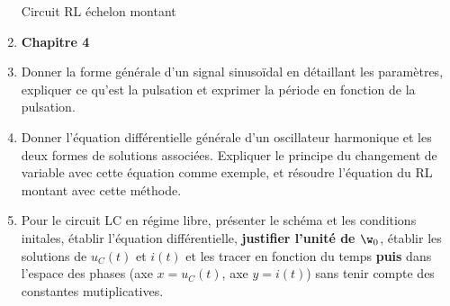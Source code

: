 \documentclass[a4paper, 12pt, final, garamond]{book}
\begin{document}
\begin{enumerate}
\begin{tasks}[label=\protect\fbox{\Alph*}, label-width=4ex]
		      \task Circuit RL échelon montant
	      \end{tasks}
	\item[] \textbf{Chapitre 4}
	\item Donner la forme générale d'un signal sinusoïdal en détaillant les
	      paramètres, expliquer ce qu'est la pulsation et exprimer la période en
	      fonction de la pulsation.
	\item Donner l'équation différentielle générale d'un oscillateur harmonique
	      et les deux formes de solutions associées. Expliquer le principe du
	      changement de variable avec cette équation comme exemple, et résoudre
	      l'équation du RL montant avec cette méthode.
	\item Pour le circuit LC en régime libre, présenter le schéma et les
        conditions initales, établir l'équation différentielle,
        \textbf{justifier l'unité de $\w_0$}, établir les solutions de $u_C(t)$
        et $i(t)$ et les tracer en fonction du temps \textbf{puis} dans l'espace
        des phases (axe $x = u_C(t)$, axe $y = i(t)$) sans tenir compte des
        constantes mutiplicatives.
\end{enumerate}
\end{document}
